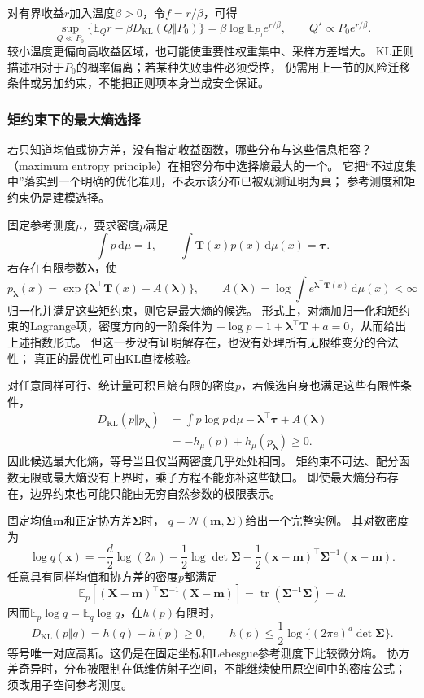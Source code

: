 对有界收益\(r\)加入温度\(\beta>0\)，令\(f=r/\beta\)，可得
\[
  \sup_{Q\ll P_0}\{\mathbb E_Qr-\beta D_{\mathrm{KL}}(Q\Vert P_0)\}
  =\beta\log\mathbb E_{P_0}e^{r/\beta},\qquad
  Q^\star\propto P_0e^{r/\beta}.
\]
较小温度更偏向高收益区域，也可能使重要性权重集中、采样方差增大。
KL正则描述相对于\(P_0\)的概率偏离；若某种失败事件必须受控，
仍需用上一节的风险迁移条件或另加约束，不能把正则项本身当成安全保证。

\subsubsection{矩约束下的最大熵选择}
\label{sec:information-maximum-entropy}

若只知道均值或协方差，没有指定收益函数，哪些分布与这些信息相容？
（maximum entropy principle）在相容分布中选择熵最大的一个。
它把“不过度集中”落实到一个明确的优化准则，不表示该分布已被观测证明为真；
参考测度和矩约束仍是建模选择。

固定参考测度\(\mu\)，要求密度\(p\)满足
\[
  \int p\,\mathrm d\mu=1,\qquad
  \int \bm T(x)p(x)\,\mathrm d\mu(x)=\bm\tau.
\]
若存在有限参数\(\bm\lambda\)，使
\[
  p_{\bm\lambda}(x)
  =\exp\{\bm\lambda^\top\bm T(x)-A(\bm\lambda)\},\qquad
  A(\bm\lambda)=\log\int e^{\bm\lambda^\top\bm T(x)}\,\mathrm d\mu(x)<\infty
\]
归一化并满足这些矩约束，则它是最大熵的候选。
形式上，对熵加归一化和矩约束的Lagrange项，密度方向的一阶条件为
\(-\log p-1+\bm\lambda^\top\bm T+a=0\)，从而给出上述指数形式。
但这一步没有证明解存在，也没有处理所有无限维变分的合法性；
真正的最优性可由KL直接核验。

对任意同样可行、统计量可积且熵有限的密度\(p\)，若候选自身也满足这些有限性条件，
\[
\begin{aligned}
  D_{\mathrm{KL}}(p\Vert p_{\bm\lambda})
  &=\int p\log p\,\mathrm d\mu-\bm\lambda^\top\bm\tau+A(\bm\lambda)\\
  &=-h_\mu(p)+h_\mu(p_{\bm\lambda})\geq0.
\end{aligned}
\]
因此候选最大化熵，等号当且仅当两密度几乎处处相同。
矩约束不可达、配分函数无限或最大熵没有上界时，乘子方程不能弥补这些缺口。
即使最大熵分布存在，边界约束也可能只能由无穷自然参数的极限表示。

固定均值\(\bm m\)和正定协方差\(\bm\Sigma\)时，
\(q=\mathcal N(\bm m,\bm\Sigma)\)给出一个完整实例。
其对数密度为
\[
  \log q(\bm x)
  =-\frac d2\log(2\pi)-\frac12\log\det\bm\Sigma
   -\frac12(\bm x-\bm m)^\top\bm\Sigma^{-1}(\bm x-\bm m).
\]
任意具有同样均值和协方差的密度\(p\)都满足
\[
  \mathbb E_p[(\bm X-\bm m)^\top\bm\Sigma^{-1}(\bm X-\bm m)]
  =\operatorname{tr}(\bm\Sigma^{-1}\bm\Sigma)=d.
\]
因而\(\mathbb E_p\log q=\mathbb E_q\log q\)，在\(h(p)\)有限时，
\[
  D_{\mathrm{KL}}(p\Vert q)=h(q)-h(p)\geq0,\qquad
  h(p)\leq\frac12\log\{(2\pi e)^d\det\bm\Sigma\}.
\]
等号唯一对应高斯。这仍是在固定坐标和Lebesgue参考测度下比较微分熵。
协方差奇异时，分布被限制在低维仿射子空间，不能继续使用原空间中的密度公式；
须改用子空间参考测度。

